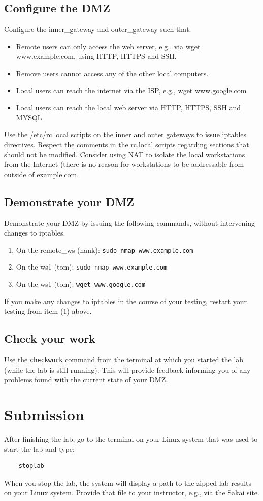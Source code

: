 \subsection{Configure the DMZ}
Configure the inner\_gateway and outer\_gateway such that:
\begin{itemize}
\item Remote users can only access the web server, e.g., via wget www.example.com, using
HTTP, HTTPS and SSH.
\item Remove users cannot access any of the other local computers.
\item Local users can reach the internet via the ISP, e.g., wget www.google.com
\item Local users can reach the local web server via HTTP, HTTPS, SSH and MYSQL
\end{itemize}

Use the /etc/rc.local scripts on the inner and outer gateways to issue iptables directives.
Respect the comments in the rc.local scripts regarding sections that should not be modified.
Consider using NAT to isolate the local workstations from the Internet (there is no reason
for workstations to be addressable from outside of example.com.

\subsection{Demonstrate your DMZ}
Demonstrate your DMZ by issuing the following commands, without intervening changes to iptables.
\begin{enumerate}
\item On the remote\_ws (hank): {\tt sudo nmap www.example.com}
\item On the ws1 (tom): {\tt sudo nmap www.example.com}
\item On the ws1 (tom): {\tt wget www.google.com}
\end{enumerate}
\noindent If you make any changes to iptables in the course of your testing, restart your testing from
item (1) above.

\subsection{Check your work}
Use the {\tt checkwork} command from the terminal at which you started the lab (while the lab is still
running).  This will provide feedback informing you of any problems found with the current state of your DMZ.

\section{Submission}
After finishing the lab, go to the terminal on your Linux system that was used to start the lab and type:
\begin{verbatim}
    stoplab 
\end{verbatim}
When you stop the lab, the system will display a path to the zipped lab results on your Linux system.  Provide that file to 
your instructor, e.g., via the Sakai site.



